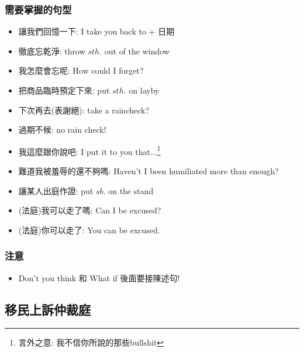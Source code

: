 \subsubsection*{需要掌握的句型}
\begin{multicols}{2}
\begin{itemize}
  \itemsep0em
  \item 讓我們回憶一下: I take you back to + 日期
  \item 徹底忘乾淨: throw $sth.$ out of the window
  \item 我怎麼會忘呢: How could I forget?
  \item 把商品臨時預定下來: put $sth.$ on layby
  \item 下次再去(表謝絕): take a raincheck?
  \item 過期不候: no rain check!
  \item 我這麼跟你說吧: I put it to you that...\footnote{言外之意: 我不信你所說的那些bullshit}
  \item 難道我被羞辱的還不夠嗎: Haven't I been humiliated more than enough?
  \item 讓某人出庭作證: put $sb.$ on the stand
  \item (法庭)我可以走了嗎: Can I be excused?
  \item (法庭)你可以走了: You can be excused.
\end{itemize}
\end{multicols}

\subsubsection*{注意}
\begin{itemize}
  \itemsep0em
  \item Don't you think 和 What if 後面要接陳述句!
\end{itemize}

\subsection{移民上訴仲裁庭}

